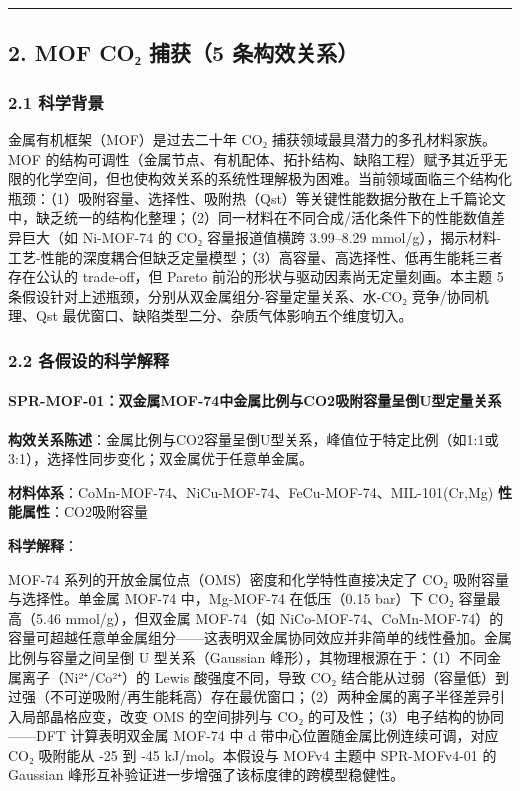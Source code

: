 \documentclass[12pt,a4paper]{ctexart}
\begin{document}
\begin{center}\rule{0.5\linewidth}{0.5pt}\end{center}

\subsection{2. MOF CO₂ 捕获（5 条构效关系）}\label{mof-coux2082-ux6355ux83b75-ux6761ux6784ux6548ux5173ux7cfb}

\subsubsection{2.1 科学背景}\label{ux79d1ux5b66ux80ccux666f}

金属有机框架（MOF）是过去二十年 CO₂ 捕获领域最具潜力的多孔材料家族。MOF 的结构可调性（金属节点、有机配体、拓扑结构、缺陷工程）赋予其近乎无限的化学空间，但也使构效关系的系统性理解极为困难。当前领域面临三个结构化瓶颈：（1）吸附容量、选择性、吸附热（Qst）等关键性能数据分散在上千篇论文中，缺乏统一的结构化整理；（2）同一材料在不同合成/活化条件下的性能数值差异巨大（如 Ni-MOF-74 的 CO₂ 容量报道值横跨 3.99--8.29 mmol/g），揭示材料-工艺-性能的深度耦合但缺乏定量模型；（3）高容量、高选择性、低再生能耗三者存在公认的 trade-off，但 Pareto 前沿的形状与驱动因素尚无定量刻画。本主题 5 条假设针对上述瓶颈，分别从双金属组分-容量定量关系、水-CO₂ 竞争/协同机理、Qst 最优窗口、缺陷类型二分、杂质气体影响五个维度切入。

\subsubsection{2.2 各假设的科学解释}\label{ux5404ux5047ux8bbeux7684ux79d1ux5b66ux89e3ux91ca}

\paragraph{SPR-MOF-01：双金属MOF-74中金属比例与CO2吸附容量呈倒U型定量关系}\label{spr-mof-01ux53ccux91d1ux5c5emof-74ux4e2dux91d1ux5c5eux6bd4ux4f8bux4e0eco2ux5438ux9644ux5bb9ux91cfux5448ux5012uux578bux5b9aux91cfux5173ux7cfb}

\textbf{构效关系陈述}：金属比例与CO2容量呈倒U型关系，峰值位于特定比例（如1:1或3:1），选择性同步变化；双金属优于任意单金属。

\textbf{材料体系}：CoMn-MOF-74、NiCu-MOF-74、FeCu-MOF-74、MIL-101(Cr,Mg) \textbar{} \textbf{性能属性}：CO2吸附容量

\textbf{科学解释}：

MOF-74 系列的开放金属位点（OMS）密度和化学特性直接决定了 CO₂ 吸附容量与选择性。单金属 MOF-74 中，Mg-MOF-74 在低压（0.15 bar）下 CO₂ 容量最高（5.46 mmol/g），但双金属 MOF-74（如 NiCo-MOF-74、CoMn-MOF-74）的容量可超越任意单金属组分------这表明双金属协同效应并非简单的线性叠加。金属比例与容量之间呈倒 U 型关系（Gaussian 峰形），其物理根源在于：（1）不同金属离子（Ni²⁺/Co²⁺）的 Lewis 酸强度不同，导致 CO₂ 结合能从过弱（容量低）到过强（不可逆吸附/再生能耗高）存在最优窗口；（2）两种金属的离子半径差异引入局部晶格应变，改变 OMS 的空间排列与 CO₂ 的可及性；（3）电子结构的协同------DFT 计算表明双金属 MOF-74 中 d 带中心位置随金属比例连续可调，对应 CO₂ 吸附能从 -25 到 -45 kJ/mol。本假设与 MOFv4 主题中 SPR-MOFv4-01 的 Gaussian 峰形互补验证进一步增强了该标度律的跨模型稳健性。
\end{document}
